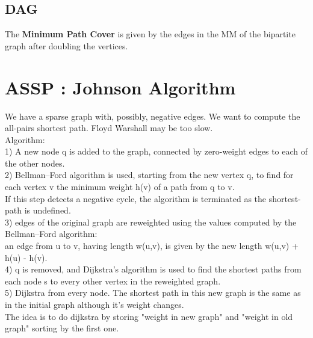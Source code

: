 \subsection{DAG}
The \textbf{Minimum Path Cover} is given by the edges in the MM of the bipartite graph after doubling the vertices.
\section{ASSP : Johnson Algorithm}
We have a sparse graph with, possibly, negative edges. We want to compute the all-pairs shortest path. Floyd Warshall may be too slow.\\
Algorithm: \\
1) A new node q is added to the graph, connected by zero-weight edges to each of the other nodes.\\
2) Bellman–Ford algorithm is used, starting from the new vertex q, to find for each vertex v the minimum weight h(v) of a path from q to v. \\
If this step detects a negative cycle, the algorithm is terminated as the shortest-path is undefined.\\
3) edges of the original graph are reweighted using the values computed by the Bellman–Ford algorithm: \\
an edge from u to v, having length w(u,v), is given by the new length w(u,v) + h(u) - h(v).\\
4) q is removed, and Dijkstra's algorithm is used to find the shortest paths from each node s to every other vertex in the reweighted graph.\\
5) Dijkstra from every node. The shortest path in this new graph is the same as in the initial graph although it's weight changes.\\
The idea is to do dijkstra by storing "weight in new graph" and "weight in old graph" sorting by the first one.\\